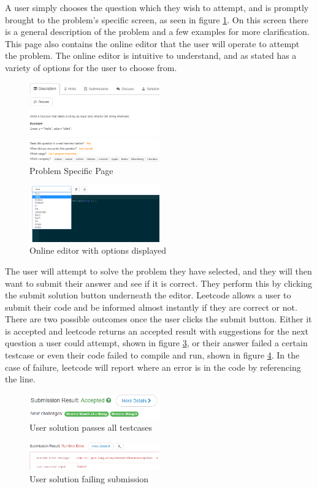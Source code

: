 \documentclass[10pt,twocolumn]{IEEEtran}
\begin{document}
A user simply chooses the question which they wish to attempt, and is promptly brought to the problem's specific screen, as seen in figure \ref{fig:problemPage}. On this screen there is a general description of the problem and a few examples for more clarification. This page also contains the online editor that the user will operate to attempt the problem. The online editor is intuitive to understand, and as stated has a variety of options for the user to choose from. 
\begin{figure}[h]
\includegraphics[width=0.5\textwidth]{problemPage.png}
\caption{Problem Specific Page}
\label{fig:problemPage}
\end{figure}

\begin{figure}[h]
\includegraphics[width=0.5\textwidth]{languageUI.png}
\caption{Online editor with options displayed}
\label{fig:langUI}
\end{figure}   
The user will attempt to solve the problem they have selected, and they will then want to submit their answer and see if it is correct. They perform this by clicking the submit solution button underneath the editor. Leetcode allows a user to submit their code and be informed almost instantly if they are correct or not. There are two possible outcomes once the user clicks the submit button. Either it is accepted and leetcode returns an accepted result with suggestions for the next question a user could attempt, shown in figure \ref{fig:accepted}, or their answer failed a certain testcase or even their code failed to compile and run, shown in figure \ref{fig:fail}. In the case of failure, leetcode will report where an error is in the code by referencing the line.  
\begin{figure}[h]
\includegraphics[width=0.5\textwidth]{accepted.png}
\caption{User solution passes all testcases}
\label{fig:accepted}
\end{figure}  
\begin{figure}[h]
\includegraphics[width=0.5\textwidth]{failure.png}
\caption{User solution failing submission}
\label{fig:fail}
\end{figure}    
\end{document}
